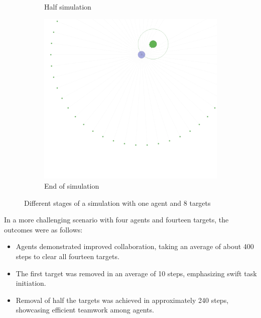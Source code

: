 \documentclass{scrartcl}
\begin{document}
\begin{figure}
\begin{subfigure}[b]{0.45\textwidth}
      \caption{Half simulation}
      \label{fig:s_mel}
  \end{subfigure}
  \hfill
  \begin{subfigure}[b]{0.45\textwidth}
      \centering
      \includegraphics[width=\textwidth]{img/1_agent_3.png}
      \caption{End of simulation} 
      \label{fig:s_ser}
  \end{subfigure}
  \caption{Different stages of a simulation with one agent and 8 targets}
  \label{fig:t}
\end{figure}

In a more challenging scenario with four agents and fourteen targets, the outcomes were as follows:
\begin{itemize}
  \item Agents demonstrated improved collaboration, taking an average of about 400 steps to clear all fourteen targets.
  \item The first target was removed in an average of 10 steps, emphasizing swift task initiation.
  \item Removal of half the targets was achieved in approximately 240 steps, showcasing efficient teamwork among agents.
\end{itemize}
\end{document}
